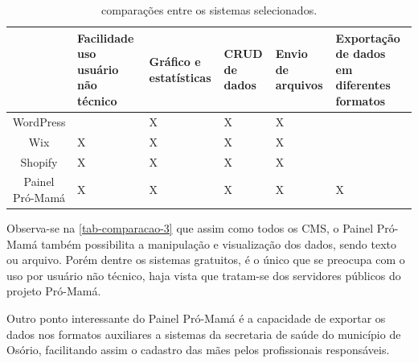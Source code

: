 \begin{table}[htb]
  \begin{center}
    \ABNTEXfontereduzida
    \caption{comparações entre os sistemas selecionados.}
    \label{tab-comparacao-3}
    \begin{tabularx}{\textwidth}{|c|>{\centering\arraybackslash}X|>{\centering\arraybackslash}X|>{\centering\arraybackslash}X|>{\centering\arraybackslash}X|>{\centering\arraybackslash}X|}
      \phantom{.}     & \textbf{Facilidade uso usuário não técnico} & \textbf{Gráfico e estatísticas} & \textbf{CRUD de dados} & \textbf{Envio de arquivos} & \textbf{Exportação de dados em diferentes formatos} \\
      \hline
      WordPress       & \phantom{.}                                 & X                               &
      X               & X                                           & \phantom{.}                                                                                                                                 \\
      \hline
      Wix             & X                                           &
      X               & X                                           & X                               & \phantom{.}                                                                                               \\
      \hline
      Shopify         & X                                           & X                               & X                      & X                          & \phantom{.}                                         \\
      \hline
      Painel Pró-Mamá & X                                           & X                               & X                      & X                          & X                                                   \\
    \end{tabularx}
  \end{center}
\end{table}

Observa-se na \autoref{tab-comparacao-3} que assim como todos os CMS, o Painel Pró-Mamá também possibilita a manipulação e visualização dos dados, sendo texto ou arquivo. Porém dentre os sistemas gratuitos, é o único que se preocupa com o uso por usuário não técnico, haja vista que tratam-se dos servidores públicos do projeto Pró-Mamá.

Outro ponto interessante do Painel Pró-Mamá é a capacidade de exportar os dados nos formatos auxiliares a sistemas da secretaria de saúde do município de Osório, facilitando assim o cadastro das mães pelos profissionais responsáveis.
